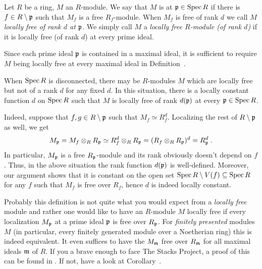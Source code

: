 \documentclass[a4paper,parskip=half,numbers=enddot, DIV=12]{scrreprt}
\begin{document}
\begin{defi} 
    Let $R$ be a ring, $M$ an $R$-module. We say that $M$ is  at $\mathfrak{p}\in \operatorname{Spec} R$ if there is $f\in R\setminus\mathfrak{p}$ such that $M_f$ is a free $R_f$-module. When $M_f$ is free of rank $d$ we call $M$ \emph{locally free of rank $d$ at $\mathfrak{p}$}. We simply call $M$ a \emph{locally free $R$-module (of rank $d$)} if it is locally free (of rank $d$) at every prime ideal.
\end{defi}
\begin{rem*}
	\begin{alphanumerate}
		\item Since each prime ideal $\mathfrak{p}$ is contained in a maximal ideal, it is sufficient to require $M$ being locally free at every maximal ideal in Definition~.
		\item When $\operatorname{Spec} R$ is disconnected, there may be $R$-modules $M$ which are locally free but not of a rank $d$ for any fixed $d$. In this situation, there is a locally constant function $d$ on $\operatorname{Spec} R$ such that $M$ is locally free of rank $d(\mathfrak{p})$ at every $\mathfrak{p}\in \operatorname{Spec} R$.
		
		Indeed, suppose that $f,g\in R\setminus\mathfrak{p}$ such that $M_f\simeq R_f^d$. Localizing the rest of $R\setminus \mathfrak{p}$ as well, we get
		\begin{align*}
			M_{\mathfrak{p}}=M_f\otimes_RR_{\mathfrak{p}}\simeq R_f^d\otimes_R R_{\mathfrak{p}}=(R_f\otimes_RR_{\mathfrak{p}})^d=R_{\mathfrak{p}}^d\;.
		\end{align*}
		In particular, $M_{\mathfrak{p}}$ is a free $R_{\mathfrak{p}}$-module and its rank obviously doesn't depend on $f$. Thus, in the above situation the rank function $d(\mathfrak{p})$ is well-defined. Moreover, our argument shows that it is constant on the open set $\operatorname{Spec} R\setminus V(f)\subseteq \operatorname{Spec} R$ for any $f$ such that $M_f$ is free over $R_f$, hence $d$ is indeed locally constant.
		\item Probably this definition is not quite what you would expect from a \emph{locally free} module and rather one would like to have an $R$-module $M$ locally free if every localization $M_{\mathfrak{p}}$ at a prime ideal $\mathfrak{p}$ is free over $R_{\mathfrak{p}}$. For \emph{finitely presented} modules $M$ (in particular, every finitely generated module over a Noetherian ring) this is indeed equivalent. It even suffices to have the $M_{\mathfrak{m}}$ free over $R_{\mathfrak{m}}$ for all maximal ideals $\mathfrak{m}$ of $R$. If you a brave enough to face The Stacks Project, a proof of this can be found in \cite[Tag 00NX]{stacks-project}. If not, have a look at Corollary~. 
	\end{alphanumerate}
\end{rem*}
\end{document}
